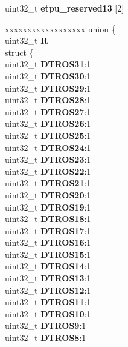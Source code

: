 \begin{DoxyCompactItemize}
\begin{tabbing}
\end{tabbing}\item 
\mbox{\label{structETPU__tag_a7e9fffe52ec026064e36683fed15b8b4}} 
uint32\+\_\+t {\bfseries etpu\+\_\+reserved13} \mbox{[}2\mbox{]}
\item 
\mbox{\label{structETPU__tag_af6affb77e0386a48109b9e47394cd309}} 
\begin{tabbing}
xx\=xx\=xx\=xx\=xx\=xx\=xx\=xx\=xx\=\kill
union \{\\
\>uint32\_t {\bfseries R}\\
\>struct \{\\
\>\>uint32\_t {\bfseries DTROS31}:1\\
\>\>uint32\_t {\bfseries DTROS30}:1\\
\>\>uint32\_t {\bfseries DTROS29}:1\\
\>\>uint32\_t {\bfseries DTROS28}:1\\
\>\>uint32\_t {\bfseries DTROS27}:1\\
\>\>uint32\_t {\bfseries DTROS26}:1\\
\>\>uint32\_t {\bfseries DTROS25}:1\\
\>\>uint32\_t {\bfseries DTROS24}:1\\
\>\>uint32\_t {\bfseries DTROS23}:1\\
\>\>uint32\_t {\bfseries DTROS22}:1\\
\>\>uint32\_t {\bfseries DTROS21}:1\\
\>\>uint32\_t {\bfseries DTROS20}:1\\
\>\>uint32\_t {\bfseries DTROS19}:1\\
\>\>uint32\_t {\bfseries DTROS18}:1\\
\>\>uint32\_t {\bfseries DTROS17}:1\\
\>\>uint32\_t {\bfseries DTROS16}:1\\
\>\>uint32\_t {\bfseries DTROS15}:1\\
\>\>uint32\_t {\bfseries DTROS14}:1\\
\>\>uint32\_t {\bfseries DTROS13}:1\\
\>\>uint32\_t {\bfseries DTROS12}:1\\
\>\>uint32\_t {\bfseries DTROS11}:1\\
\>\>uint32\_t {\bfseries DTROS10}:1\\
\>\>uint32\_t {\bfseries DTROS9}:1\\
\>\>uint32\_t {\bfseries DTROS8}:1\\

\end{tabbing}
\end{DoxyCompactItemize}
